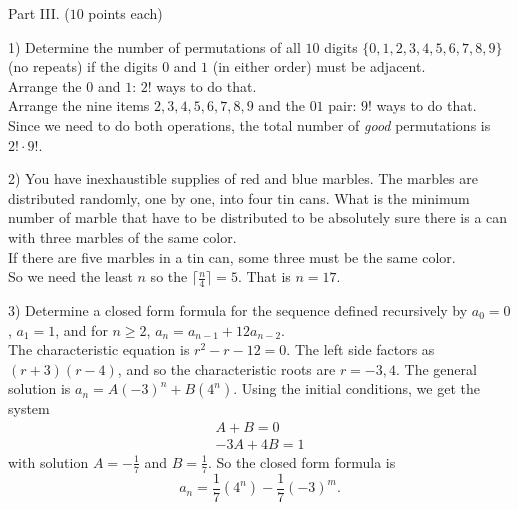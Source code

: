\documentclass[11pt]{amsart}
\begin{document}
\vfill
\break
\begin{center}
Part III. ($10$ points each)  
\end{center}


\medskip

1)  Determine the number of permutations of all $10$ digits $\{0,1,2,3,4,5,6,7,8,9\}$ 
\vskip -1pt\hskip 12pt  (no repeats) if the digits $0$ and $1$ (in either order) must be adjacent. \\[3pt]

{\color{blue}
Arrange the $0$ and $1$: $2!$ ways to do that.\\
Arrange the nine items $2,3,4,5,6,7,8,9$ and the $01$ pair: $9!$ ways to do that.\\
Since we need to do both operations, the total number of {\itshape good} permutations is $2!\cdot 9!$.\\[5pt]
}




\vfill

2) You have inexhaustible supplies of red and blue marbles. The marbles are distributed\vskip-1pt\hskip15pt 
randomly,  one by one, into four tin cans. What is the minimum number of marble that \vskip-1pt\hskip15pt
have to be  distributed to be absolutely sure there is a can with three marbles of the\vskip -1pt\hskip 15pt
 same color.\\[3pt]
 
 {\color{blue}
 If there are five marbles in a tin can, some three must be the same color. \\
 So we need the least $n$
 so the $\lceil{\frac{n}{4}}\rceil = 5$. That is $n = 17$.\\[5pt]
 }

\vfill
\break

3) Determine a closed form formula for the sequence defined recursively by $a_0 = 0$, $a_1=1$,
\vskip -1pt\hskip 12pt and for $n\geq 2$, $a_n = a_{n-1} + 12a_{n-2}$.\\[3pt]

{\color{blue}
The characteristic equation is $r^2 -r-12 =0$. The left side factors as $(r+3)(r-4)$,
and so the characteristic roots are $r = -3,4$. The general solution is $a_n = A(-3)^n + B(4^n)$. Using the initial conditions, we get the system 
\begin{align*}
A+B = 0\\
-3A+4B = 1
\end{align*}
with solution $A = -\frac{1}{7}$ and $B = \frac{1}{7}$. So the closed form formula
is
\[
a_n = \frac{1}{7}(4^n) - \frac{1}{7}(-3)^m.
\]\\[5pt]
}
\end{document}
